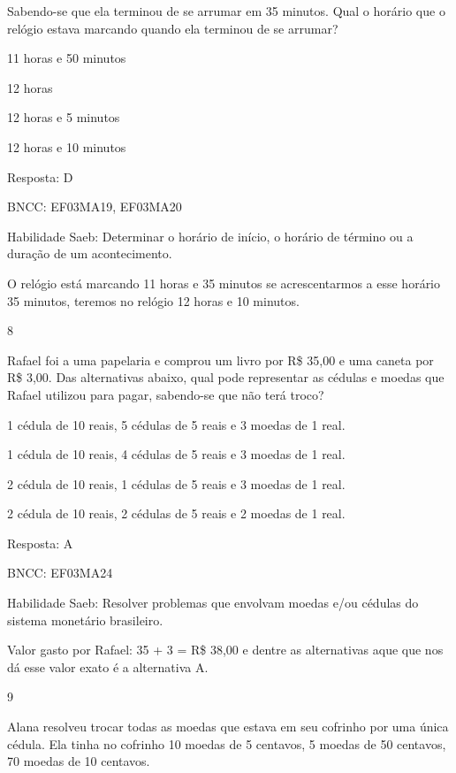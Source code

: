 \begin{escolha}
\begin{escolha}
Sabendo-se que ela terminou de se arrumar em 35 minutos. Qual o horário
que o relógio estava marcando quando ela terminou de se arrumar?

\begin{escolha}

\item
  11 horas e 50 minutos
\item
  12 horas
\item
  12 horas e 5 minutos
\item
  12 horas e 10 minutos
\end{escolha}

Resposta: D

BNCC: EF03MA19, EF03MA20

Habilidade Saeb: Determinar o horário de início, o horário de término ou
a duração de um acontecimento.

O relógio está marcando 11 horas e 35 minutos se acrescentarmos a esse
horário 35 minutos, teremos no relógio 12 horas e 10 minutos.

\num{8}

Rafael foi a uma papelaria e comprou um livro por R\$ 35,00 e uma caneta
por R\$ 3,00. Das alternativas abaixo, qual pode representar as cédulas
e moedas que Rafael utilizou para pagar, sabendo-se que não terá troco?

\begin{escolha}

\item
  1 cédula de 10 reais, 5 cédulas de 5 reais e 3 moedas de 1 real.
\item
  1 cédula de 10 reais, 4 cédulas de 5 reais e 3 moedas de 1 real.
\item
  2 cédula de 10 reais, 1 cédulas de 5 reais e 3 moedas de 1 real.
\item
  2 cédula de 10 reais, 2 cédulas de 5 reais e 2 moedas de 1 real.
\end{escolha}

Resposta: A

BNCC: EF03MA24

Habilidade Saeb: Resolver problemas que envolvam moedas e/ou cédulas do
sistema monetário brasileiro.

Valor gasto por Rafael: 35 + 3 = R\$ 38,00 e dentre as alternativas aque
que nos dá esse valor exato é a alternativa A.

\num{9}

Alana resolveu trocar todas as moedas que estava em seu cofrinho por uma
única cédula. Ela tinha no cofrinho 10 moedas de 5 centavos, 5 moedas de
50 centavos, 70 moedas de 10 centavos.


\end{escolha}
\end{escolha}
